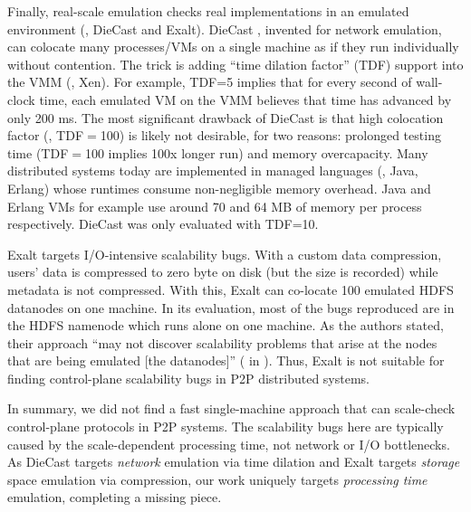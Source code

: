 Finally, real-scale emulation checks real implementations in an emulated
environment (\eg, DieCast and Exalt).  DieCast \cite{Gupta+08-DieCast},
invented for network emulation, can colocate many processes/VMs on a single
machine as if they run individually without contention.  The trick is adding
``time dilation factor'' (TDF) support \cite{Gupta+06-TimeDilation} into the
VMM (\eg, Xen).  For example, TDF=5 implies that for every second of wall-clock
time, each emulated VM on the VMM believes that time has advanced by only 200
ms.  The most significant drawback of DieCast is that high colocation factor
(\eg, TDF$=$100) is likely not desirable, for two reasons: prolonged testing
time (TDF$=$100 implies 100x longer run) and memory overcapacity.  Many
distributed systems today are implemented in managed languages (\eg, Java,
Erlang) whose runtimes consume non-negligible memory overhead. Java and Erlang
VMs for example use around 70 and 64 MB of memory per process respectively.
DieCast was only evaluated with TDF=10.

Exalt \cite{Wang+14-Exalt} targets I/O-intensive scalability bugs.  With a
custom data compression, users' data is compressed to zero byte on disk (but the
size is recorded) while metadata is not compressed.  With this, Exalt can
co-locate 100 emulated HDFS datanodes on one machine.  In its evaluation, most
of the bugs reproduced are in the HDFS namenode which runs alone on one machine.
As the authors stated, their approach ``may not discover scalability problems
that arise at the nodes that are being emulated [the datanodes]'' ( in
\cite{Wang+14-Exalt}).  Thus, Exalt is not suitable for finding control-plane
scalability bugs in P2P distributed systems.

In summary, we did not find a fast single-machine approach that can scale-check
control-plane protocols in P2P systems.  The scalability bugs here are
typically caused by the scale-dependent processing time, not network or I/O
bottlenecks.  As DieCast targets {\em network} emulation via time dilation and
Exalt targets {\em storage} space emulation via compression, our work uniquely
targets {\em processing time} emulation, completing a missing piece.


